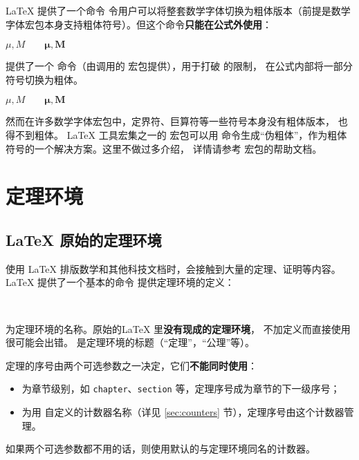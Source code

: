 \LaTeX{} 提供了一个命令  令用户可以将整套数学字体切换为粗体版本（前提是数学字体宏包本身支持粗体符号）。但这个命令\textbf{只能在公式外使用}：
\begin{example}
$\mu, M \qquad
\mathbf{\mu}, \mathbf{M}$
\end{example}

 提供了一个  命令（由调用的  宏包提供），用于打破  的限制，
在公式内部将一部分符号切换为粗体。
\begin{example}
$\mu, M \qquad
\boldsymbol{\mu}, \boldsymbol{M}$
\end{example}

然而在许多数学字体宏包中，定界符、巨算符等一些符号本身没有粗体版本， 也得不到粗体。
\LaTeX{} 工具宏集之一的  宏包可以用  命令生成“伪粗体”，作为粗体符号的一个解决方案。这里不做过多介绍，
详情请参考  宏包的帮助文档。

\section{定理环境}\label{sec:theorems}

\subsection{\LaTeX{} 原始的定理环境}\label{subsec:latex-theorems}

使用 \LaTeX{} 排版数学和其他科技文档时，会接触到大量的定理、证明等内容。
\LaTeX{} 提供了一个基本的命令  提供定理环境的定义：
\begin{command}
 \\
\end{command}

 为定理环境的名称。原始的\LaTeX{} 里\textbf{没有现成的定理环境}，
不加定义而直接使用很可能会出错。 是定理环境的标题（“定理”，“公理”等）。

定理的序号由两个可选参数之一决定，它们\textbf{不能同时使用}：
\begin{itemize}
  \item {} 为章节级别，如 \texttt{chapter}、\texttt{section} 等，定理序号成为章节的下一级序号；
  \item {} 为用  自定义的计数器名称（详见 \ref{sec:counters} 节），定理序号由这个计数器管理。
\end{itemize}
如果两个可选参数都不用的话，则使用默认的与定理环境同名的计数器。

